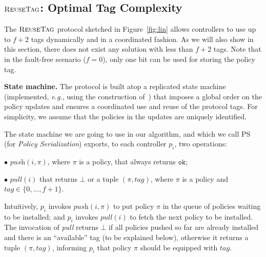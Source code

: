 \documentclass[11pt,pdftex,letter]{article}
\newcommand{\DPO}{\textsc{ReuseTag}}
\newcommand{\PS}{\textsc{PS}}
\newcommand{\eg}{{\it e.g.}}
\newcommand{\ssnote}[1]{\textcolor{heraldBlue}{\small \bf [SS: #1]}}
\newcommand{\ssnote}[1]{}
\begin{document}
\subsection{$\DPO$: Optimal Tag Complexity}

The $\DPO$ protocol sketched in Figure~\ref{fig:lin}
allows controllers to use up to $f+2$ tags dynamically and in a coordinated fashion.
As we will also show in this section, there does not exist any
solution with less than $f+2$ tags.
Note that in the fault-free scenario ($f=0$), only one bit can be used
for storing the policy tag.

\vspace{1mm}
\noindent
\textbf{State machine.}
The protocol is built atop a replicated state machine
(implemented, \eg, using the
construction of~\cite{Her91}) that imposes a global
order on the policy updates and ensures a coordinated use and reuse of
the protocol tags.
For simplicity, we assume that the policies in the updates are uniquely identified.

The state machine we are going to use in our algorithm, and which we
call {\PS} (for \emph{Policy Serialization})
exports, to each controller $p_i$, two operations:

\vspace{1.5mm}
\noindent $\bullet$
$\textit{push}(i,\pi)$, where $\pi$ is a policy, that always returns
  $\texttt{ok}$; %

\vspace{0.5mm}
\noindent $\bullet$ $\textit{pull}(i)$ that returns $\bot$  or a tuple
  $(\pi,\textit{tag})$,
  where $\pi$ is a policy and
  $\textit{tag}\in\{0,\ldots, f+1\}$.
%
\vspace{1.5mm}

Intuitively, $p_i$ invokes $\textit{push}(i,\pi)$ to put policy $\pi$
in the queue of policies waiting to be installed;
and $p_i$ invokes $\textit{pull}(i)$ to fetch the next policy
to be installed. The invocation of \textit{pull} returns $\bot$ if all policies pushed so
far are already installed and there is an ``available'' tag (to be
explained below), otherwise it returns a tuple
$(\pi,\textit{tag})$, informing $p_i$ that policy $\pi$ should be
equipped with $\textit{tag}$.
\end{document}
